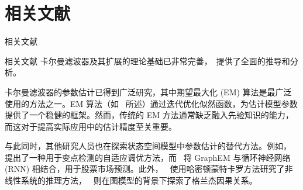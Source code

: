 \documentclass[presentation,aspectratio=169]{ctexbeamer}
\begin{document}
\section{相关文献}

\begin{frame}
\Huge{\centerline{\textcolor{covblue}{相关文献}}}
\end{frame}

\begin{frame}{相关文献}
卡尔曼滤波器及其扩展的理论基础已非常完善，~\cite{Särkkä_Svensson_2023_textbook}提供了全面的推导和分析。
\vspace{8pt}

卡尔曼滤波器的参数估计已得到广泛研究，其中期望最大化 (EM) 算法是最广泛使用的方法之一。EM 算法（如~\cite{Särkkä_Svensson_2023_textbook} 所述）通过迭代优化似然函数，为估计模型参数提供了一个稳健的框架。然而，传统的 EM 方法通常缺乏融入先验知识的能力，而这对于提高实际应用中的估计精度至关重要。
\vspace{8pt}
\pause

与此同时，其他研究人员也在探索状态空间模型中参数估计的替代方法。例如，~\cite{tsampourakis2022alr_changepoint} 提出了一种用于变点检测的自适应调优方法，而~\cite{sharma2023stock_later} 将 GraphEM 与循环神经网络 (RNN) 相结合，用于股票市场预测。此外，~\cite{cui2024inference_non_linear} 使用哈密顿蒙特卡罗方法研究了非线性系统的推理方法，~\cite{mohanty2025iclr_granger} 则在图模型的背景下探索了格兰杰因果关系。
\end{frame}




\end{document}
